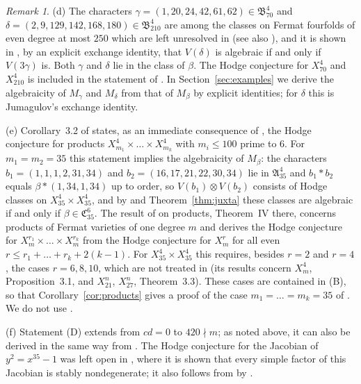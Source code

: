\documentclass[11pt]{amsart}
\theoremstyle{definition}
\theoremstyle{remark}
\newtheorem{remark}[theorem]{Remark}
\numberwithin{equation}{section}
\newcommand{\fA}{\mathfrak{A}}
\newcommand{\fB}{\mathfrak{B}}
\newcommand{\fC}{\mathfrak{C}}
\begin{document}
\begin{remark}
(d) The characters $\gamma=(1,20,24,42,61,62)\in\fB^4_{70}$ and $\delta=(2,9,129,142,168,180)\in\fB^4_{210}$ are among the classes on Fermat fourfolds of even degree at most $250$ which are left unresolved in \cite[Cor.~6.1]{Jum26b} (see also \cite[Appendix~D]{Jum26a}), and it is shown in \cite[Thm.~4.1, Prop.~4.2]{Jum26b}, by an explicit exchange identity, that $V(\delta)$ is algebraic if and only if $V(3\gamma)$ is. Both $\gamma$ and $\delta$ lie in the class of $\beta$. The Hodge conjecture for $X^4_{70}$ and $X^4_{210}$ is included in the statement of \cite[Cor.~3.2]{Ka16}. In Section~\ref{sec:examples} we derive the algebraicity of $M_\gamma$ and $M_\delta$ from that of $M_\beta$ by explicit identities; for $\delta$ this is Jumagulov's exchange identity.

(e) Corollary~3.2 of \cite{dS21} states, as an immediate consequence of \cite{Sh79}, the Hodge conjecture for products $X^4_{m_1}\times\dots\times X^4_{m_k}$ with $m_i\le 100$ prime to $6$. For $m_1=m_2=35$ this statement implies the algebraicity of $M_\beta$: the characters $b_1=(1,1,1,2,31,34)$ and $b_2=(16,17,21,22,30,34)$ lie in $\fA^4_{35}$ and $b_1*b_2$ equals $\beta*(1,34,1,34)$ up to order, so $V(b_1)\otimes V(b_2)$ consists of Hodge classes on $X^4_{35}\times X^4_{35}$, and by \cite[Thm.~II(c2)]{Sh79} and Theorem~\ref{thm:juxta} these classes are algebraic if and only if $\beta\in\fC^6_{35}$. The result of \cite{Sh79} on products, Theorem~IV there, concerns products of Fermat varieties of one degree $m$ and derives the Hodge conjecture for $X^{r_1}_m\times\dots\times X^{r_k}_m$ from the Hodge conjecture for $X^r_m$ for all even $r\le r_1+\dots+r_k+2(k-1)$. For $X^4_{35}\times X^4_{35}$ this requires, besides $r=2$ and $r=4$, the cases $r=6,8,10$, which are not treated in \cite{dS21} (its results concern $X^4_m$, Proposition~3.1, and $X^n_{21}$, $X^n_{27}$, Theorem~3.3). These cases are contained in (B), so that Corollary~\ref{cor:products} gives a proof of the case $m_1=\dots=m_k=35$ of \cite[Cor.~3.2]{dS21}. We do not use \cite[Cor.~3.2]{dS21}.

(f) Statement (D) extends \cite[Thm.~0.1(i)]{Ao00} from $cd=0$ to $420\nmid m$; as noted above, it can also be derived in the same way from \cite{MMMV26}. The Hodge conjecture for the Jacobian of $y^2=x^{35}-1$ was left open in \cite[Example~8.6]{Ao02}, where it is shown that every simple factor of this Jacobian is stably nondegenerate; it also follows from \cite[Thm.~1.1]{MMMV26} by \cite[Cor.~3.2]{Ao00}.


\end{remark}
\end{document}
